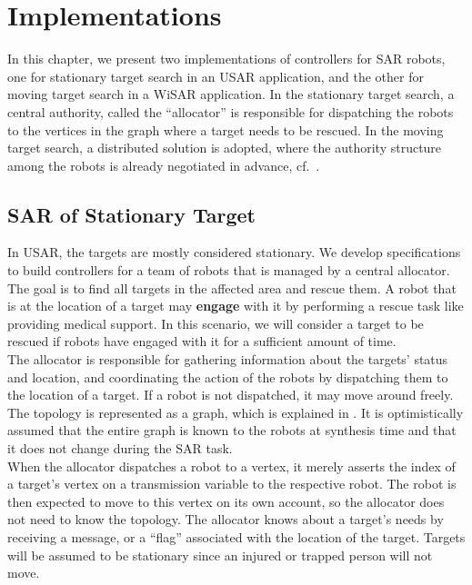 \chapter{Implementations} \label{sec:impl}

In this chapter, we present two implementations of controllers for SAR robots, one for stationary target search in an USAR application, and the other for moving target search in a WiSAR application. In the stationary target search, a central authority, called the ``allocator'' is responsible for dispatching the robots to the vertices in the graph where a target needs to be rescued. In the moving target search, a distributed solution is adopted, where the authority structure among the robots is already negotiated in advance, cf.\ .\\

\section{SAR of Stationary Target} \label{sec:statSAR}

In USAR, the targets are mostly considered stationary. We develop specifications to build controllers for a team of robots that is managed by a central allocator. The goal is to find all targets in the affected area and rescue them. A robot that is at the location of a target may {\bf engage} with it by performing a rescue task like providing medical support. In this scenario, we will consider a target to be rescued if  robots have engaged with it for a sufficient amount of time.\\

The allocator is responsible for gathering information about the targets' status and location, and coordinating the action of the robots by dispatching them to the location of a target. If a robot is not dispatched, it may move around freely. The topology is represented as a graph, which is explained in . It is optimistically assumed that the entire graph is known to the robots at synthesis time and that it does not change during the SAR task.\\



When the allocator dispatches a robot to a vertex, it merely asserts the index of a target's vertex on a transmission variable to the respective robot. The robot is then expected to move to this vertex on its own account, so the allocator does not need to know the topology. The allocator knows about a target's needs by receiving a message, or a ``flag'' associated with the location of the target. Targets will be assumed to be stationary since an injured or trapped person will not move.\\

